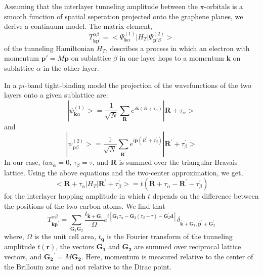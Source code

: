 Assuming that the interlayer tunneling amplitude between the $\pi$-orbitals is a smooth function of spatial seperation projected onto the graphene planes, we derive a continuum model. The matrix element,
\begin{equation}
    T_{\mathbf{kp^\prime}}^{\alpha\beta}=<\Psi_{\mathbf{k}\alpha}^{(1)}|H_T|\Psi_{\mathbf{p\prime}\beta}^{(2)}>
\end{equation}
of the tunneling Hamiltonian $H_T$, describes a process in which an electron with momentum $\mathbf{p\prime}=M\mathbf{p}$ on sublattice $\beta$ in one layer hops to a momentum $\mathbf{k}$ on sublattice $\alpha$ in the other layer.

In a $pi$-band tight-binding model the projection of the wavefunctions of the two layers onto a given sublattice are:
\begin{equation}
    |\psi_{\mathbf{k} \alpha}^{(1)}>=\frac{1}{\sqrt{N}} \sum_{\mathbf{R}} e^{i \mathbf{k}\left(R+\tau_{\alpha}\right)}|\mathbf{R}+\tau_{\alpha}>
\end{equation}
and
\begin{equation}
    |\psi_{\mathbf{p} \beta}^{(2)}>=\frac{1}{\sqrt{N}} \sum_{\mathbf{R}^{\prime}} e^{i \mathbf{p}\left(R^{\prime}+\tau_{\beta}^{\prime}\right)}|\mathbf{R}^{\prime}+\tau_{\beta}^{\prime}>
\end{equation}
In our case, $tau_{\alpha}=0$, $\tau_{\beta}=\tau$, and $\mathbf{R}$ is summed over the triangular Bravais lattice. Using the above equations and the two-center approximation, we get,
\begin{equation}
    <\mathbf{R}+\tau_{\alpha}|H_T|\mathbf{R}^\prime +\tau_{\beta}^\prime>=t(\mathbf{R}+\tau_{\alpha}-\mathbf{R}^\prime - \tau_{\beta}^\prime)
\end{equation}
for the interlayer hopping amplitude in which $t$ depends on the difference between the positions of the two carbon atoms. We find that
\begin{equation}
T_{\mathbf{k p}^{\prime}}^{\alpha \beta}=\sum_{\mathbf{G}_{1} \mathbf{G}_{2}} \frac{t_{\overline{\mathbf{k}}+\mathbf{G}_{1}}}{\Omega} e^{i\left[\mathbf{G}_{1} \tau_{\alpha}-\mathbf{G}_{2}\left(\tau_{\beta}-\tau\right)-\mathbf{G}_{2}^{\prime} \mathbf{d}\right]} \delta_{\overline{\mathbf{k}}+\mathbf{G}_{1}, \overline{\mathbf{p}}^{\prime}+\mathbf{G}_{2}^{\prime}}
\end{equation}
where, $\Omega$ is the unit cell area, $t_{\mathbf{q}}$ is the Fourier transform of the tunneling amplitude $t(\mathbf{r})$, the vectors $\mathbf{G_1}$ and $\mathbf{G_2}$ are summed over reciprocal lattice vectors, and $\mathbf{G_2}^\prime = M \mathbf{G_2}$. Here, momentum is measured relative to the center of the Brillouin zone and not relative to the Dirac point.

